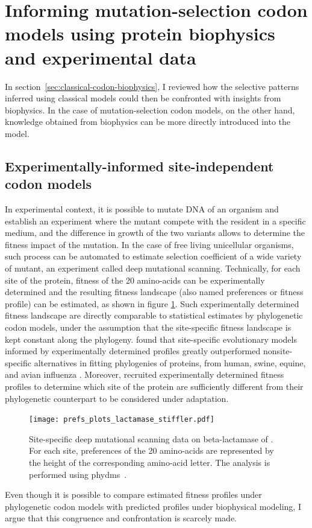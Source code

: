\section{Informing mutation-selection codon models using protein biophysics and experimental data}
\label{sec:mechanistic-codon-biophysics}

In section~\ref{sec:classical-codon-biophysics}, I reviewed how the selective patterns inferred using classical models could then be confronted with insights from biophysics.
In the case of mutation-selection codon models, on the other hand, knowledge obtained from biophysics can be more directly introduced into the model.

\subsection{Experimentally-informed site-independent codon models}

In experimental context, it is possible to mutate DNA of an organism and establish an experiment where the mutant compete with the resident in a specific medium, and the difference in growth of the two variants allows to determine the fitness impact of the mutation.
In the case of free living unicellular organisms, such process can be automated to estimate selection coefficient of a wide variety of mutant, an experiment called deep mutational scanning.
Technically, for each site of the protein, fitness of the 20 amino-acids can be experimentally determined and the resulting fitness landscape (also named preferences or fitness profile) can be estimated, as shown in figure \ref{fig:intro-deep-mut-profile}.
Such experimentally determined fitness landscape are directly comparable to statistical estimates by phylogenetic codon models, under the assumption that the site-specific fitness landscape is kept constant along the phylogeny.
\citet{Bloom2014,Bloom2014a} found that site-specific evolutionary models informed by experimentally determined profiles greatly outperformed nonsite-specific alternatives in fitting phylogenies of proteins, from human, swine, equine, and avian influenza \citep{Doud2015} .
Moreover, \citet{Bloom2017} recruited experimentally determined fitness profiles to determine which site of the protein are sufficiently different from their phylogenetic counterpart to be considered under adaptation.

\begin{figure}[H]
    \centering
    \texttt{[image: prefs\_plots\_lactamase\_stiffler.pdf]}
    \caption[Deep mutational scanning profile]{
    Site-specific deep mutational scanning data on beta-lactamase of \citet{Stiffler2015}.
    For each site, preferences of the 20 amino-acids are represented by the height of the corresponding amino-acid letter.
    The analysis is performed using phydms~\citep{Hilton2017}.}
    \label{fig:intro-deep-mut-profile}
\end{figure}
Even though it is possible to compare estimated fitness profiles under phylogenetic codon models with predicted profiles under biophysical modeling, I argue that this congruence and confrontation is scarcely made.

